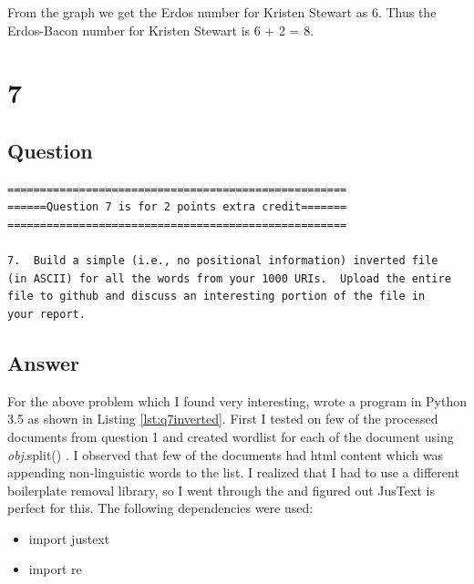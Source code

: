 \documentclass[letterpaper,11pt]{article}
\begin{document}
From the graph we get the Erdos number for Kristen Stewart as 6. Thus the Erdos-Bacon number for Kristen Stewart is 6 + 2 = 8.

\clearpage



\section*{7}

\subsection*{Question}

\begin{verbatim}
====================================================
======Question 7 is for 2 points extra credit=======
====================================================

7.  Build a simple (i.e., no positional information) inverted file
(in ASCII) for all the words from your 1000 URIs.  Upload the entire
file to github and discuss an interesting portion of the file in
your report.
\end{verbatim}

\clearpage
\subsection*{Answer}

For the above problem which I found very interesting, wrote a program in Python 3.5 as shown in Listing \ref{lst:q7inverted}. First I tested on few of the processed documents from question 1 and created wordlist for each of the document using \emph{obj}.split() \cite{countingref}. I observed that few of the documents had html content which was appending non-linguistic words to the list. I realized that I had to use a different boilerplate removal library, so I went through the \cite{boilerpiperef} and figured out JusText \cite{githubref} is perfect for this. The following dependencies were used:

\begin{itemize}
    \item import justext
    \item import re

\end{itemize}



\end{document}

